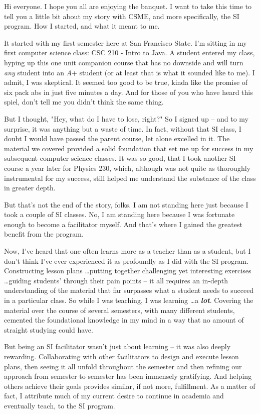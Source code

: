 \documentclass{article}
\begin{document}
Hi everyone.  I hope you all are enjoying the banquet.  I want to take this time
to tell you a little bit about my story with CSME, and more specifically, the SI
program.  How I started, and what it meant to me.

It started with my first semester here at San Francisco State. I'm sitting in
my first computer science class: CSC 210 - Intro to Java.  A
student entered my class, hyping up this one unit companion course
that has no downside and will turn \emph{any} student into an \emph{A}+ student
(or at least that is what it sounded like to me).
I admit, I was skeptical. It seemed too good to be true, kinda like the
promise of six pack abs in just five minutes a day.  And for those of you who
have heard this spiel, don't tell me you didn't think the same thing.

But I thought, "Hey, what do I have to lose, right?" So I signed up -- and to my surprise,
it was anything but a waste of time. In fact, without that SI class, I
doubt I would have passed the parent course, let alone excelled in it.  The
material we covered provided a solid foundation that
set me up for success in my subsequent computer science classes.  It was so good,
that I took another SI course a year later for Physics 230, which, although was
not quite as thoroughly instrumental for my success, still helped me understand
the substance of the class in greater depth. 

But that's not the end of the story, folks.
I am not standing here just because I took a couple of SI classes. No, I am
standing here because I was fortunate enough to become a facilitator myself.
And that's where I gained the greatest benefit from the program.

Now, I've heard that one often learns more as a teacher than as a student,
but I don't think I've ever experienced it as profoundly as I did with the SI
program.  Constructing lesson plans \dots putting together challenging yet
interesting exercises \dots guiding students' through their pain points -- it
all requires an in-depth understanding of the material that far surpasses what a
student needs to succeed in a particular class.  So while I was
teaching, I was learning \dots a \emph{\textbf{lot}}.  Covering the material over the
course of several semesters, with many different students, cemented the
foundational knowledge in my mind in a way that no amount of straight studying
could have.

But being an SI facilitator wasn't just about learning -- it was also deeply rewarding.
Collaborating with other facilitators to design and execute lesson
plans, then seeing it all unfold throughout the semester and then refining our
approach from semester to semester has been immensely gratifying.  And helping others achieve
their goals provides similar, if not more, fulfillment.  As a matter of fact, I attribute much
of my current desire to continue in academia and eventually teach, to the SI program.
\end{document}
